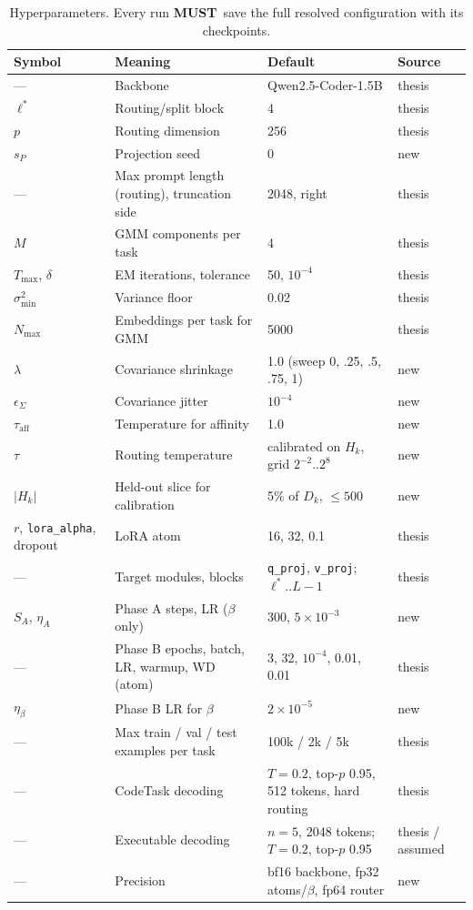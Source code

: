 \documentclass[11pt]{article}
\newcommand{\MUST}{\textbf{MUST}}
\begin{document}
\begin{table}[h]
\centering
\small
\begin{tabularx}{\textwidth}{@{}l X l l@{}}
\toprule
Symbol & Meaning & Default & Source\\
\midrule
--- & Backbone & Qwen2.5-Coder-1.5B & thesis\\
$\ell^*$ & Routing/split block & 4 & thesis\\
$p$ & Routing dimension & 256 & thesis\\
$s_P$ & Projection seed & 0 & new\\
--- & Max prompt length (routing), truncation side & 2048, right & thesis\\
$M$ & GMM components per task & 4 & thesis\\
$T_{\max}$, $\delta$ & EM iterations, tolerance & 50, $10^{-4}$ & thesis\\
$\sigma^2_{\min}$ & Variance floor & 0.02 & thesis\\
$N_{\max}$ & Embeddings per task for GMM & 5000 & thesis\\
$\lambda$ & Covariance shrinkage & 1.0 (sweep 0, .25, .5, .75, 1) & new\\
$\epsilon_\Sigma$ & Covariance jitter & $10^{-4}$ & new\\
$\tau_{\mathrm{aff}}$ & Temperature for affinity & 1.0 & new\\
$\tau$ & Routing temperature & calibrated on $H_k$, grid $2^{-2}..2^{8}$ & new\\
$|H_k|$ & Held-out slice for calibration & 5\% of $D_k$, $\le 500$ & new\\
$r$, \texttt{lora\_alpha}, dropout & LoRA atom & 16, 32, 0.1 & thesis\\
--- & Target modules, blocks & \texttt{q\_proj}, \texttt{v\_proj}; $\ell^*..L-1$ & thesis\\
$S_A$, $\eta_A$ & Phase A steps, LR ($\beta$ only) & 300, $5\times10^{-3}$ & new\\
--- & Phase B epochs, batch, LR, warmup, WD (atom) & 3, 32, $10^{-4}$, 0.01, 0.01 & thesis\\
$\eta_\beta$ & Phase B LR for $\beta$ & $2\times10^{-5}$ & new\\
--- & Max train / val / test examples per task & 100k / 2k / 5k & thesis\\
--- & CodeTask decoding & $T{=}0.2$, top-$p$ 0.95, 512 tokens, hard routing & thesis\\
--- & Executable decoding & $n{=}5$, 2048 tokens; $T{=}0.2$, top-$p$ 0.95 & thesis / assumed\\
--- & Precision & bf16 backbone, fp32 atoms/$\beta$, fp64 router & new\\
\bottomrule
\end{tabularx}
\caption{Hyperparameters. Every run \MUST\ save the full resolved configuration with its checkpoints.}
\end{table}
\end{document}

